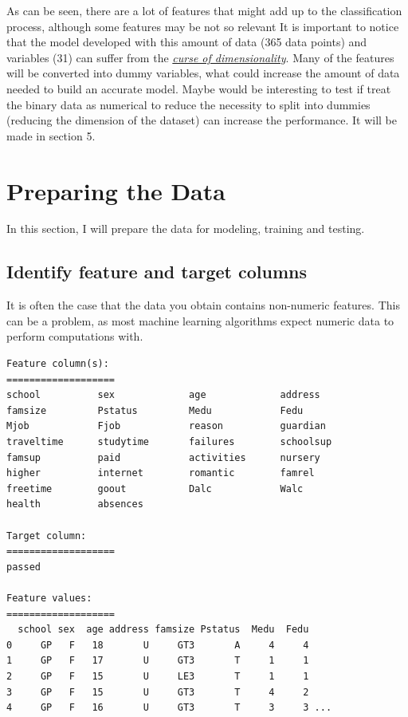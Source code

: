 \documentclass[a4paper]{article}
\begin{document}
As can be seen, there are a lot of features that might add up to the classification process, although some features may be not so relevant It is important to notice that the model developed with this amount of data (365 data points) and variables (31) can suffer from the  \href{https://en.wikipedia.org/wiki/Curse_of_dimensionality}{\textit{curse of dimensionality}}. Many of the features will be converted into dummy variables, what could increase the amount of data needed to build an accurate model. Maybe would be interesting to test if treat the binary data as numerical to reduce the necessity to split into dummies (reducing the dimension of the dataset) can increase the performance. It will be made in section 5.

\section{Preparing the Data}
In this section, I will prepare the data for modeling, training and testing.
\subsection{Identify feature and target columns}
It is often the case that the data you obtain contains non-numeric features. This can be a problem, as most machine learning algorithms expect numeric data to perform computations with.

\begin{lstlisting}
Feature column(s):
===================
school         	sex            	age            	address        
famsize        	Pstatus        	Medu           	Fedu           
Mjob           	Fjob           	reason         	guardian       
traveltime     	studytime      	failures       	schoolsup      
famsup         	paid           	activities     	nursery        
higher         	internet       	romantic       	famrel         
freetime       	goout          	Dalc           	Walc           
health         	absences       

Target column:
===================
passed

Feature values:
===================
  school sex  age address famsize Pstatus  Medu  Fedu
0     GP   F   18       U     GT3       A     4     4
1     GP   F   17       U     GT3       T     1     1
2     GP   F   15       U     LE3       T     1     1
3     GP   F   15       U     GT3       T     4     2
4     GP   F   16       U     GT3       T     3     3 ...
\end{lstlisting}
\end{document}
